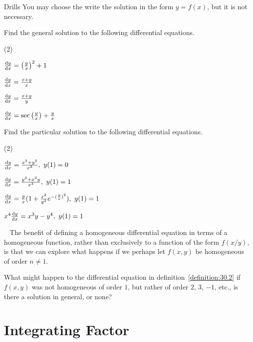 \begin{questions}{Drills}
You may choose the write the solution in the form $y=f(x)$, but it is not necessary.

\vspace{5pt}
Find the general solution to the following differential equations.
\vspace{5pt}
\begin{question_set}(2)
\item $\dv{y}{x}=\left(\frac{y}{x}\right)^2+1$
\item $\dv{y}{x}=\frac{x+y}{x}$ \\
\item $\dv{y}{x}=\frac{x+y}{y}$
\item $\dv{y}{x}=\sec\left(\frac{y}{x}\right)+\frac{y}{x}$
\end{question_set}
\vspace{5pt}
Find the particular solution to the following differential equations.
\vspace{5pt}
\begin{question_set}(2)
\item $\dv{y}{x}=\frac{x^2+y^2}{x^2}, \ y(1)=0$
\item $\dv{y}{x}=\frac{y^3+x^2y}{x^3}, \ y(1)=1$ \\
\item $\dv{y}{x}=\frac{y}{x}(1+\frac{x^2}{y^2}e^{-(\frac{y}{x})^2}), \ y(1)=1$
\item $x^4\dv{y}{x}=x^3y-y^4, \ y(1)=1$ \\
\end{question_set}
\end{questions}

\begin{thinking}{~}
The benefit of defining a homogeneous differential equation in terms of a homogeneous function, rather than exclusively to a function of the form $f(x/y)$, is that we can explore what happens if we perhaps let $f(x,y)$ be homogeneous of order $n \neq 1$. \vspace{10pt}

What might happen to the differential equation in definition~\ref{definition:30.2} if $f(x,y)$ was not homogeneous of order $1$, but rather of order $2$, $3$, $-1$, etc., is there a solution in general, or none?
\end{thinking}

\section{Integrating Factor}

